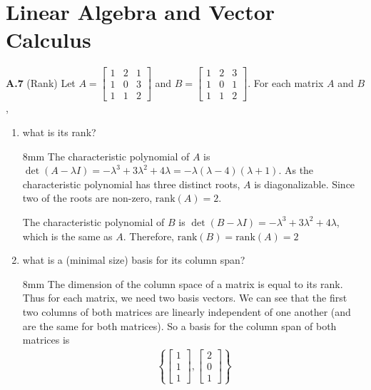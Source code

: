 \documentclass{article}
\newenvironment{solution}{\begin{adjustwidth}{8mm}{}}{\end{adjustwidth}}
\begin{document}
\section*{Linear Algebra and Vector Calculus}

\textbf{A.7}
(Rank)
Let $A = \begin{bmatrix} 
                1 & 2 & 1 \\
                1 & 0 & 3 \\ 
                1 & 1 & 2 
        \end{bmatrix}$ 
        and 
        $B = \begin{bmatrix} 
                1 & 2 & 3 \\ 
                1 & 0 & 1 \\ 
                1 & 1 & 2 
        \end{bmatrix}$.
For each matrix $A$ and $B$,

\begin{enumerate}
        \item what is its rank?
        \begin{solution}
                The characteristic polynomial of $A$ is 
                $\det(A - \lambda I) = -\lambda^3 + 3\lambda^2 + 4\lambda = -\lambda(\lambda - 4) (\lambda + 1)$.
                As the characteristic polynomial has three distinct roots, $A$ is diagonalizable.
                Since two of the roots are non-zero, $\text{rank} (A) = 2$.

                The characteristic polynomial of $B$ is
                $\det(B - \lambda I) = -\lambda^3 + 3\lambda^2 + 4\lambda$, which is the same as $A$.
                Therefore, $\text{rank} (B) = \text{rank} (A) = 2$
        \end{solution}
        \item what is a (minimal size) basis for its column span?
        \begin{solution}
                The dimension of the column space of a matrix is equal to its rank.
                Thus for each matrix, we need two basis vectors.
                We can see that the first two columns of both matrices are linearly independent of one another (and are the same for both matrices).
                So a basis for the column span of both matrices is 
                \begin{align*}
                        \left\{
                        \begin{bmatrix} 1 \\ 1 \\ 1 \end{bmatrix},
                        \begin{bmatrix} 2 \\ 0 \\ 1 \end{bmatrix}
                        \right\}
                \end{align*}
        \end{solution}
\end{enumerate}
\end{document}

